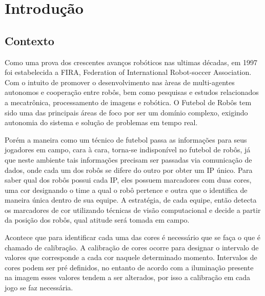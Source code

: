 \chapter{Introdução} \label{Cap:Introducao}
\section{Contexto}
Como uma prova dos crescentes avanços robóticos nas ultimas décadas, em 1997 foi estabelecida a FIRA\cite{FiraHistory}, Federation of International Robot-soccer Association. Com o intuito de promover o desenvolvimento nas àreas de multi-agentes autonomos e cooperação entre robôs, bem como pesquisas e estudos relacionados a mecatrônica, processamento de imagens e robótica\cite{FiraOverview}. O Futebol de Robôs tem sido  uma das principais áreas de foco por ser um domínio complexo, exigindo autonomia do sistema e solução de problemas em tempo real\cite{Costa:2000}. 

Porém a maneira como um técnico de futebol passa as informações para seus jogadores em campo, cara à cara, torna-se indisponível no futebol de robôs, já que neste ambiente tais informações precisam ser passadas via comunicação de dados, onde cada um dos robôs se difere do outro por obter um IP único. Para saber qual dos robôs possui cada IP, eles possuem marcadores com duas cores, uma cor designando o time a qual o robô pertence e outra que o identifica de maneira única dentro de sua equipe. A estratégia, de cada equipe, então detecta os marcadores de cor utilizando técnicas de visão computacional e decide a partir da posição dos robôs, qual atitude será tomada em campo.

Acontece que para identificar cada uma das cores é necessário que se faça o que é chamado de calibração. A calibração de cores ocorre para designar o intervalo de valores que corresponde a cada cor naquele determinado momento. Intervalos de cores podem ser pré definidos, no entanto de acordo com a iluminação presente na imagem esses valores tendem a ser alterados, por isso a calibração em cada jogo se faz necessária.
